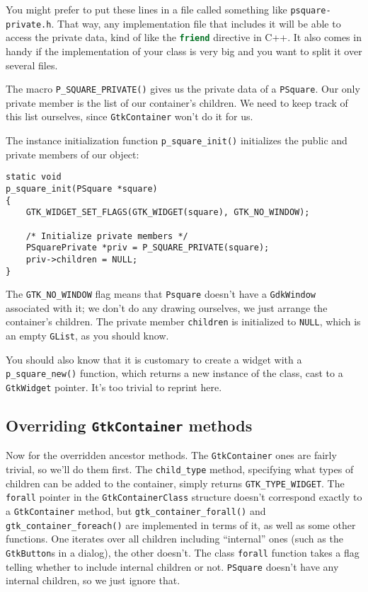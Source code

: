 \documentclass[%
			   halfparskip,smallheadings,pointlessnumbers]%
			   {scrartcl} %
\begin{document}
You might prefer to put these lines in a file called something like \texttt{psquare-private.h}. That way, any implementation file that includes it will be able to access the private data, kind of like the \lstinline[language=C++]$friend$ directive in C++. It also comes in handy if the implementation of your class is very big and you want to split it over several files.

The macro \lstinline$P_SQUARE_PRIVATE()$ gives us the private data of a \lstinline$PSquare$. Our only private member is the list of our container's children. We need to keep track of this list ourselves, since \lstinline$GtkContainer$ won't do it for us. 

The instance initialization function \lstinline$p_square_init()$ initializes the public and private members of our object:

\begin{lstlisting}
static void
p_square_init(PSquare *square)
{
	GTK_WIDGET_SET_FLAGS(GTK_WIDGET(square), GTK_NO_WINDOW);
	
	/* Initialize private members */
	PSquarePrivate *priv = P_SQUARE_PRIVATE(square);
	priv->children = NULL;
}
\end{lstlisting}

The \lstinline$GTK_NO_WINDOW$ flag means that \lstinline$Psquare$ doesn't have a \lstinline$GdkWindow$ associated with it; we don't do any drawing ourselves, we just arrange the container's children. The private member \lstinline$children$ is initialized to \lstinline$NULL$, which is an empty \lstinline$GList$, as you should know.

You should also know that it is customary to create a widget with a \lstinline$p_square_new()$ function, which returns a new instance of the class, cast to a \lstinline$GtkWidget$ pointer. It's too trivial to reprint here.

\subsection{Overriding \lstinline$GtkContainer$ methods}

Now for the overridden ancestor methods. The \lstinline$GtkContainer$ ones are fairly trivial, so we'll do them first. The \lstinline$child_type$ method, specifying what types of children can be added to the container, simply returns \lstinline$GTK_TYPE_WIDGET$. The \lstinline$forall$ pointer in the \lstinline$GtkContainerClass$ structure doesn't correspond exactly to a \lstinline$GtkContainer$ method, but \lstinline$gtk_container_forall()$ and \lstinline$gtk_container_foreach()$ are implemented in terms of it, as well as some other functions. One iterates over all children including ``internal'' ones (such as the \lstinline$GtkButton$s in a dialog), the other doesn't. The class \lstinline$forall$ function takes a flag telling whether to include internal children or not. \lstinline$PSquare$ doesn't have any internal children, so we just ignore that.
\end{document}
